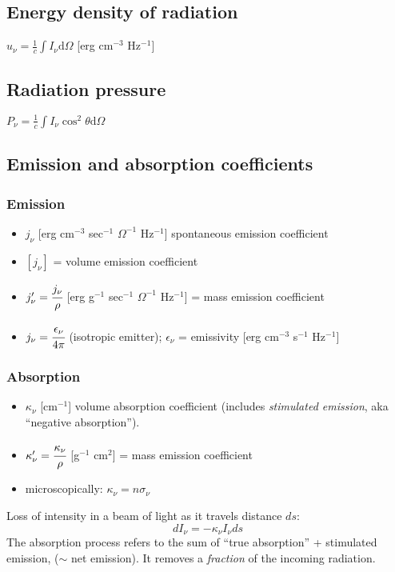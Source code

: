 \documentclass[12pt]{article}
\newcommand{\mar}[1]{\hspace{0pt}\marginpar{-\textcolor{black}{#1}-}}
\begin{document}
\mar{25}
\subsection{Energy density of radiation}
$u_{\nu} = \frac{1}{c}\int{I_{\nu}\mathrm{d}\Omega}$ [erg cm$^{-3}$
Hz$^{-1}$]
\subsection{Radiation pressure} $P_{\nu} =
\frac{1}{c}\int{I_{\nu}\cos^{2}\theta\mathrm{d}\Omega}$

\subsection{Emission and absorption coefficients}
\subsubsection{Emission}
\begin{itemize}
    \item $j_{\nu}$ [erg cm$^{-3}$ sec$^{-1}$ $\Omega^{-1}$ Hz$^{-1}$]
        spontaneous emission coefficient
    \item $[j_{\nu}]$ = volume emission coefficient
    \item $j'_{\nu} = \cfrac{j_{\nu}}{\rho}$ [erg g$^{-1}$ sec$^{-1}$ $\Omega^{-1}$ Hz$^{-1}$]
        = mass emission coefficient
    \item $j_{\nu} = \cfrac{\epsilon_{\nu}}{4\pi}$ (isotropic emitter);
        $\epsilon_{\nu}$ = emissivity [erg cm$^{-3}$ s$^{-1}$ Hz$^{-1}$]
\end{itemize}
\subsubsection{Absorption}\mar{26}
\begin{itemize}
    \item $\kappa_{\nu}$ [cm$^{-1}$] volume absorption coefficient (includes
        \emph{stimulated emission}, aka ``negative absorption'').
    \item $\kappa'_{\nu} = \cfrac{\kappa_{\nu}}{\rho}$ [g$^{-1}$ cm$^{2}$]
        = mass emission coefficient
    \item microscopically: $\kappa_{\nu} = n\sigma_{\nu}$
\end{itemize}
Loss of intensity in a beam of light as it travels distance $ds$:$${
    dI_{\nu} = -\kappa_{\nu}I_{\nu}ds
}$$
The absorption process refers to the sum of ``true absorption'' + stimulated emission,
($\sim$ net emission). It
removes a \emph{fraction} of the incoming radiation.
\end{document}

